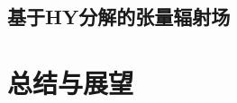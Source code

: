 \documentclass[10pt,twocolumn,letterpaper]{article}
\begin{document}
\subsection{基于HY分解的张量辐射场}


\section{总结与展望}
\label{sec:conclusion}


{\small


}
\end{document}
